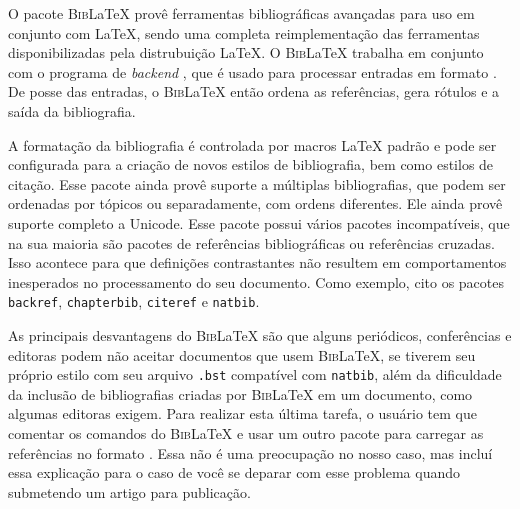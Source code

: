 O pacote \textsc{Bib}\LaTeX{} provê ferramentas bibliográficas avançadas para uso em conjunto com \LaTeX{}, sendo uma completa reimplementação das ferramentas disponibilizadas pela distrubuição \LaTeX{}. O \textsc{Bib}\LaTeX{} trabalha em conjunto com o programa de \textit{backend} , que é usado para processar entradas em formato . De posse das entradas, o \textsc{Bib}\LaTeX{} então ordena as referências, gera rótulos e a saída da bibliografia.

A formatação da bibliografia é controlada por macros \LaTeX{} padrão e pode ser configurada para a criação de novos estilos de bibliografia, bem como estilos de citação. Esse pacote ainda provê suporte a múltiplas bibliografias, que podem ser ordenadas por tópicos ou separadamente, com ordens diferentes. Ele ainda provê suporte completo a Unicode. Esse pacote possui vários pacotes incompatíveis, que na sua maioria são pacotes de referências bibliográficas ou referências cruzadas. Isso acontece para que definições contrastantes não resultem em comportamentos inesperados no processamento do seu documento. Como exemplo, cito os pacotes \texttt{backref}, \texttt{chapterbib}, \texttt{citeref} e \texttt{natbib}.

As principais desvantagens do \textsc{Bib}\LaTeX{} são que alguns periódicos, conferências e editoras podem não aceitar documentos que usem \textsc{Bib}\LaTeX{}, se tiverem seu próprio estilo com seu arquivo \texttt{.bst} compatível com \texttt{natbib}, além da dificuldade da inclusão de bibliografias criadas por \textsc{Bib}\LaTeX{} em um documento, como algumas editoras exigem. Para realizar esta última tarefa, o usuário tem que comentar os comandos do \textsc{Bib}\LaTeX{} e usar um outro pacote para carregar as referências no formato \index{}. Essa não é uma preocupação no nosso caso, mas incluí essa explicação para o caso de você se deparar com esse problema quando submetendo um artigo para publicação.

